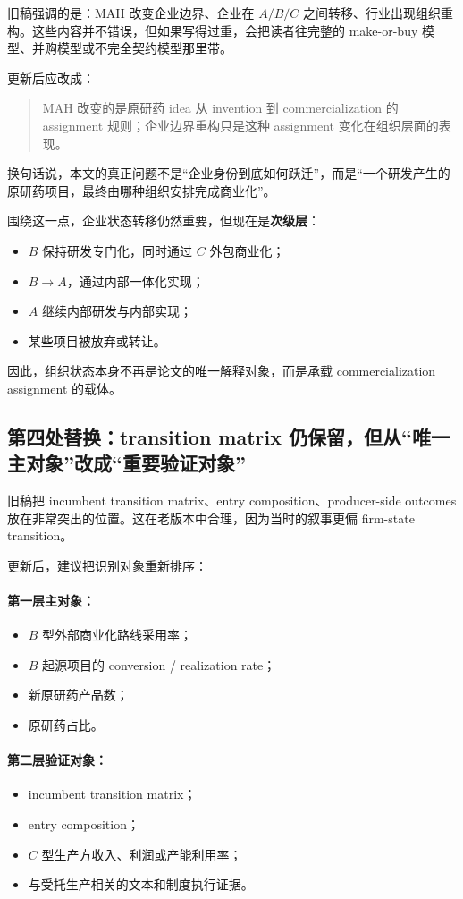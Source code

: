 \documentclass[12pt,fontset=none]{ctexart}
\begin{document}
旧稿强调的是：MAH 改变企业边界、企业在 $A/B/C$ 之间转移、行业出现组织重构。这些内容并不错误，但如果写得过重，会把读者往完整的 make-or-buy 模型、并购模型或不完全契约模型那里带。

更新后应改成：

\begin{quote}
MAH 改变的是原研药 idea 从 invention 到 commercialization 的 assignment 规则；企业边界重构只是这种 assignment 变化在组织层面的表现。
\end{quote}

换句话说，本文的真正问题不是“企业身份到底如何跃迁”，而是“一个研发产生的原研药项目，最终由哪种组织安排完成商业化”。

围绕这一点，企业状态转移仍然重要，但现在是\textbf{次级层}：
\begin{itemize}
    \item $B$ 保持研发专门化，同时通过 $C$ 外包商业化；
    \item $B\to A$，通过内部一体化实现；
    \item $A$ 继续内部研发与内部实现；
    \item 某些项目被放弃或转让。
\end{itemize}

因此，组织状态本身不再是论文的唯一解释对象，而是承载 commercialization assignment 的载体。

\subsection{第四处替换：transition matrix 仍保留，但从“唯一主对象”改成“重要验证对象”}

旧稿把 incumbent transition matrix、entry composition、producer-side outcomes 放在非常突出的位置。这在老版本中合理，因为当时的叙事更偏 firm-state transition。

更新后，建议把识别对象重新排序：

\paragraph{第一层主对象：}
\begin{itemize}
    \item $B$ 型外部商业化路线采用率；
    \item $B$ 起源项目的 conversion / realization rate；
    \item 新原研药产品数；
    \item 原研药占比。
\end{itemize}

\paragraph{第二层验证对象：}
\begin{itemize}
    \item incumbent transition matrix；
    \item entry composition；
    \item $C$ 型生产方收入、利润或产能利用率；
    \item 与受托生产相关的文本和制度执行证据。
\end{itemize}
\end{document}
